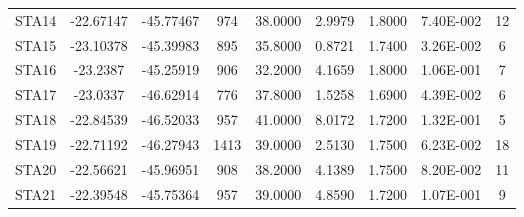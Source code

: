 \begin{landscape}
\begin{table}[!Ht]
\begin{center}
\begin{tabular}{| c | c | c | c | c | c | c | c | c |}
STA14 & -22.67147 & -45.77467 & 974 & 38.0000 & 2.9979 & 1.8000 & 7.40E-002 & 12\\
STA15 & -23.10378 & -45.39983 & 895 & 35.8000 & 0.8721 & 1.7400 & 3.26E-002 & 6\\
STA16 & -23.2387 & -45.25919 & 906 & 32.2000 & 4.1659 & 1.8000 & 1.06E-001 & 7\\
STA17 & -23.0337 & -46.62914 & 776 & 37.8000 & 1.5258 & 1.6900 & 4.39E-002 & 6\\
STA18 & -22.84539 & -46.52033 & 957 & 41.0000 & 8.0172 & 1.7200 & 1.32E-001 & 5\\
STA19 & -22.71192 & -46.27943 & 1413 & 39.0000 & 2.5130 & 1.7500 & 6.23E-002 & 18\\
STA20 & -22.56621 & -45.96951 & 908 & 38.2000 & 4.1389 & 1.7500 & 8.20E-002 & 11\\
STA21 & -22.39548 & -45.75364 & 957 & 39.0000 & 4.8590 & 1.7200 & 1.07E-001 & 9\\
\hline
\end{tabular}
\label{tabelaMoho}
\end{center}
\end{table}
\end{landscape}

